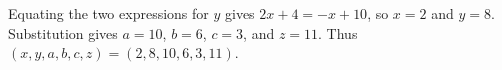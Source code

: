 Equating the two expressions for $y$ gives $2x+4=-x+10$, so $x=2$ and $y=8$. Substitution gives $a=10$, $b=6$, $c=3$, and $z=11$. Thus $\boxed{(x,y,a,b,c,z)=(2,8,10,6,3,11)}$.
